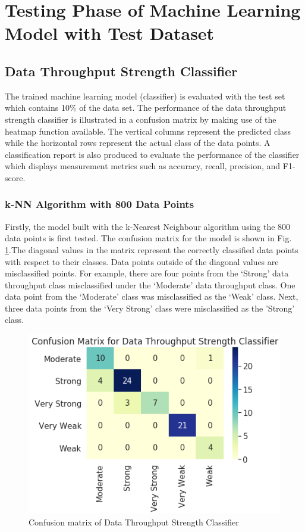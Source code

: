 \section{Testing Phase of Machine Learning Model with Test Dataset} \label{Section: Testing Phase of ML Model}
\subsection{Data Throughput Strength Classifier}
The trained machine learning model (classifier) is evaluated with the test set which contains 10\% of the data set. The performance of the data throughput strength classifier is illustrated in a confusion matrix by making use of the heatmap function available. The vertical columns represent the predicted class while the horizontal rows represent the actual class of the data points. A classification report is also produced to evaluate the performance of the classifier which displays measurement metrics such as accuracy, recall, precision, and F1-score. 

\subsubsection{k-NN Algorithm with 800 Data Points}
Firstly, the model built with the k-Nearest Neighbour algorithm using the 800 data points is first tested. The confusion matrix for the model is shown in Fig. \ref{fig_cm1}.The diagonal values in the matrix represent the correctly classified data points with respect to their classes. Data points outside of the diagonal values are misclassified points. For example, there are four points from the `Strong' data throughput class misclassified under the `Moderate' data throughput class. One data point from the `Moderate' class was misclassified as the `Weak' class. Next, three data points from the `Very Strong' class were misclassified as the 'Strong' class.

\begin{figure} [ht]
    \centering
    \includegraphics[scale=1.0]{pages/Chapter5/Chapter 5 images/knn_800.PNG}
    \caption{Confusion matrix of Data Throughput Strength Classifier}
    \label{fig_cm1}
\end{figure}

